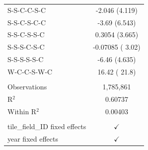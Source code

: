 \begin{table}[H]
\begin{tabular}{lc}
      S-S-C-C-S-C                      & -2.046 (4.119)\\   
      S-S-C-S-C-C                      & -3.69 (6.543)\\   
      S-S-C-S-S-C                      & 0.3054 (3.665)\\   
      S-S-S-C-S-C                      & -0.07085 ( 3.02)\\   
      S-S-S-S-S-C                      & -6.46 (4.635)\\   
      W-C-C-S-W-C                      & 16.42 ( 21.8)\\   
       \\
      Observations                     & 1,785,861\\  
      R$^2$                            & 0.60737\\  
      Within R$^2$                     & 0.00403\\  
       \\
      tile\_field\_ID fixed effects  & $\checkmark$\\   
      year fixed effects               & $\checkmark$\\   
      \bottomrule
   \end{tabular}
\end{table}


